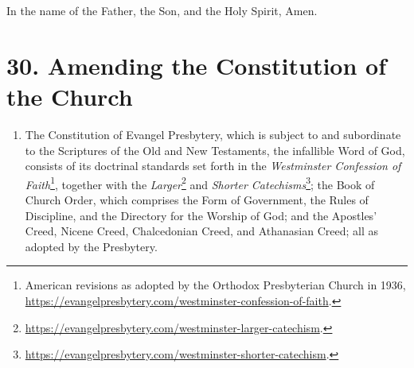 \documentclass[
]{book}
\providecommand{\tightlist}{%
  \setlength{\itemsep}{0pt}\setlength{\parskip}{0pt}}
\begin{document}
In the name of the Father, the Son, and the Holy Spirit, Amen.

\hypertarget{amending-the-constitution-of-the-church}{%
\section*{30. Amending the Constitution of the Church}\label{amending-the-constitution-of-the-church}}

\protect\hypertarget{chapter-slug-30-amending-the-constitution-of-the-church}{\href{}{}}

\begin{enumerate}
\def\labelenumi{\arabic{enumi}.}
\tightlist
\item
  \protect\hypertarget{30}{\href{}{}}\protect\hypertarget{30.1}{\href{}{}}The Constitution of Evangel Presbytery, which is subject to and subordinate to the Scriptures of the Old and New Testaments, the infallible Word of God, consists of its doctrinal standards set forth in the \emph{Westminster Confession of Faith}\footnote{American revisions as adopted by the Orthodox Presbyterian Church in 1936, \url{https://evangelpresbytery.com/westminster-confession-of-faith}.}, together with the \emph{Larger}\footnote{\url{https://evangelpresbytery.com/westminster-larger-catechism}.} and \emph{Shorter Catechisms}\footnote{\url{https://evangelpresbytery.com/westminster-shorter-catechism}.}; the Book of Church Order, which comprises the Form of Government, the Rules of Discipline, and the Directory for the Worship of God; and the Apostles' Creed, Nicene Creed, Chalcedonian Creed, and Athanasian Creed; all as adopted by the Presbytery.
\end{enumerate}
\end{document}
